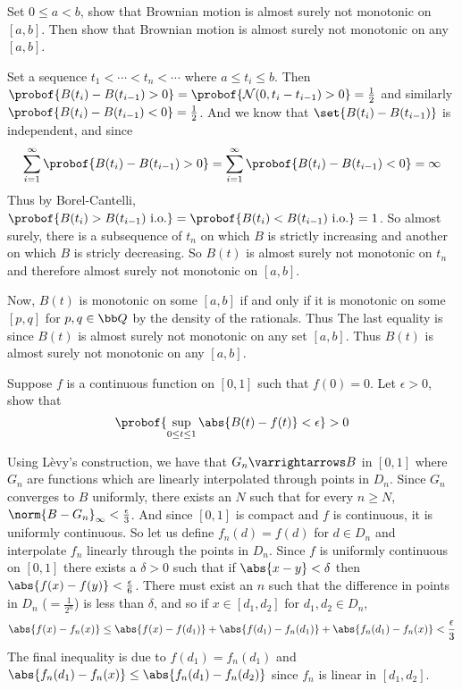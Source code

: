 \bexerc

    Set $0\leq a<b$, show that Brownian motion is almost surely not monotonic on $[a,b]$.
    Then show that Brownian motion is almost surely not monotonic on any $[a,b]$.

\eexerc

Set a sequence $t_1<\cdots<t_n<\cdots$ where $a\leq t_i\leq b$.
Then $\probof{B(t_i)-B(t_{i-1})>0}=\probof{{\cal N}(0,t_i-t_{i-1})>0}=\frac12$ and similarly $\probof{B(t_i)-B(t_{i-1})<0}=\frac12$.
And we know that $\set{B(t_i)-B(t_{i-1})}$ is independent, and since
$$ \sum_{i=1}^\infty\probof{B(t_i) - B(t_{i-1})>0} = \sum_{i=1}^\infty\probof{B(t_i) - B(t_{i-1})<0} = \infty $$
Thus by Borel-Cantelli, $\probof{B(t_i)>B(t_{i-1})\hbox{ i.o.}}=\probof{B(t_i)<B(t_{i-1})\hbox{ i.o.}}=1$.
So almost surely, there is a subsequence of $t_n$ on which $B$ is strictly increasing and another on which $B$ is stricly decreasing.
So $B(t)$ is almost surely not monotonic on $t_n$ and therefore almost surely not monotonic on $[a,b]$.

Now, $B(t)$ is monotonic on some $[a,b]$ if and only if it is monotonic on some $[p,q]$ for $p,q\in{\bb Q}$ by the density of the rationals.
Thus
The last equality is since $B(t)$ is almost surely not monotonic on any set $[a,b]$.
Thus $B(t)$ is almost surely not monotonic on any $[a,b]$.

\bexerc

    Suppose $f$ is a continuous function on $[0,1]$ such that $f(0)=0$.
    Let $\epsilon>0$, show that
    $$ \probof{\sup_{0\leq t\leq1}\abs{B(t)-f(t)}<\epsilon} > 0 $$

\eexerc

Using L\`evy's construction, we have that $G_n\varrightarrows B$ in $[0,1]$ where $G_n$ are functions which are linearly interpolated through points in $D_n$.
Since $G_n$ converges to $B$ uniformly, there exists an $N$ such that for every $n\geq N$, $\norm{B-G_n}_\infty<\frac\epsilon3$.
And since $[0,1]$ is compact and $f$ is continuous, it is uniformly continuous.
So let us define $f_n(d)=f(d)$ for $d\in D_n$ and interpolate $f_n$ linearly through the points in $D_n$.
Since $f$ is uniformly continuous on $[0,1]$ there exists a $\delta>0$ such that if $\abs{x-y}<\delta$ then $\abs{f(x)-f(y)}<\frac\epsilon6$.
There must exist an $n$ such that the difference in points in $D_n$ ($=\frac1{2^n}$) is less than $\delta$, and so if $x\in[d_1,d_2]$ for $d_1,d_2\in D_n$,
$$ \abs{f(x) - f_n(x)} \leq \abs{f(x) - f(d_1)} + \abs{f(d_1) - f_n(d_1)} + \abs{f_n(d_1) - f_n(x)} < \frac\epsilon3 $$
The final inequality is due to $f(d_1)=f_n(d_1)$ and $\abs{f_n(d_1)-f_n(x)}\leq\abs{f_n(d_1)-f_n(d_2)}$ since $f_n$ is linear in $[d_1,d_2]$.


